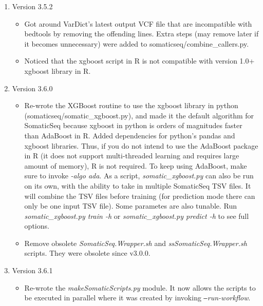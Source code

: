 \documentclass[10pt,letterpaper]{article}
\begin{document}
\begin{sloppypar}
\begin{enumerate}
\begin{itemize}
		\end{itemize}

		
	\item Version 3.5.2

        \begin{itemize}
            \item Got around VarDict's latest output VCF file that are incompatible with bedtools by removing the offending lines. Extra steps (may remove later if it becomes unnecessary) were added to somaticseq/combine\_callers.py.
            
            \item Noticed that the xgboost script in R is not compatible with version 1.0+ xgboost library in R.
            
	\end{itemize}
		
    
	\item Version 3.6.0

        \begin{itemize}
            \item Re-wrote the XGBoost routine to use the xgboost library in python (somaticseq/somatic\_xgboost.py), and made it the default algorithm for SomaticSeq because xgboost in python is orders of magnitudes faster than AdaBoost in R. Added dependencies for python's pandas and xgboost libraries. Thus, if you do not intend to use the AdaBoost package in R (it does not support multi-threaded learning and requires large amount of memory), R is not required. To keep using AdaBoost, make sure to invoke \textit{-algo ada}. As a script, \textit{somatic\_xgboost.py} can also be run on its own, with the ability to take in multiple SomaticSeq TSV files. It will combine the TSV files before training (for prediction mode there can only be one input TSV file). Some parametes are also tunable. Run \textit{somatic\_xgboost.py train -h} or \textit{somatic\_xgboost.py predict -h} to see full options. 
            
            \item Remove obsolete \textit{SomaticSeq.Wrapper.sh} and \textit{ssSomaticSeq.Wrapper.sh} scripts. They were obsolete since v3.0.0. 
            
	\end{itemize}
    
    
	\item Version 3.6.1

        \begin{itemize}
            \item Re-wrote the \textit{makeSomaticScripts.py} module. It now allows the scripts to be executed in parallel where it was created by invoking \textit{\texttt{--}run-workflow}.
            

\end{itemize}
\end{enumerate}
\end{sloppypar}
\end{document}
